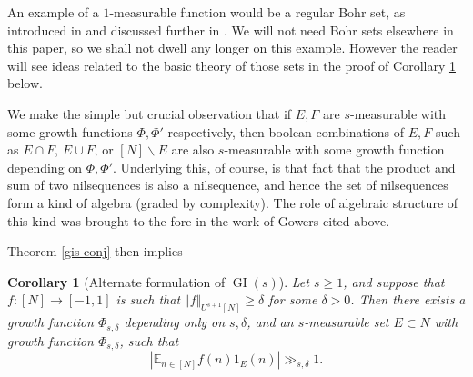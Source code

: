 \documentclass[11pt,reqno]{amsart}
\numberwithin{equation}{section}
\theoremstyle{plain}
\newtheorem{corollary}[subsection]{Corollary}
\theoremstyle{definition}
\renewcommand{\geq}{\geqslant}
\newcommand\E{{\mathbb{E}}}
\newcommand\1{{\bf 1}}
\newcommand\2{{\bf 2}}
\newcommand\GI{\operatorname{GI}}
\begin{document}
An example of a $1$-measurable function would be a regular Bohr set, as introduced in \cite{bourgain-triples} and discussed further in \cite[\S 2]{green-tao-u3inverse}. We will not need Bohr sets elsewhere in this paper, so we shall not dwell any longer on this example. However the reader will see ideas related to the basic theory of those sets in the proof of Corollary \ref{corda} below.

We make the simple but crucial observation that if $E, F$ are $s$-measurable with some growth functions $\Phi, \Phi'$ respectively, then boolean combinations of $E, F$ such as $E \cap F$, $E \cup F$, or $[N] \backslash E$ are also $s$-measurable with some growth function depending on $\Phi,\Phi'$. Underlying this, of course, is that fact that the product and sum of two nilsequences is also a nilsequence, and hence the set of nilsequences form a kind of algebra (graded by complexity). The role of algebraic structure of this kind was brought to the fore in the work of Gowers \cite{gowers-regularity} cited above.

Theorem \ref{gis-conj} then implies

\begin{corollary}[Alternate formulation of $\GI(s)$]\label{corda} Let $s \geq 1$, and suppose that $f : [N] \rightarrow [-1,1]$ is such that $\Vert f \Vert_{U^{s+1}[N]} \geq \delta$ for some $\delta>0$.   Then there exists a growth function $\Phi_{s,\delta}$ depending only on $s,\delta$, and an $s$-measurable set $E \subset N$ with growth function $\Phi_{s,\delta}$, such that
$$ |\E_{n \in [N]} f(n) 1_E(n)| \gg_{s,\delta} 1.$$
\end{corollary}
\end{document}
